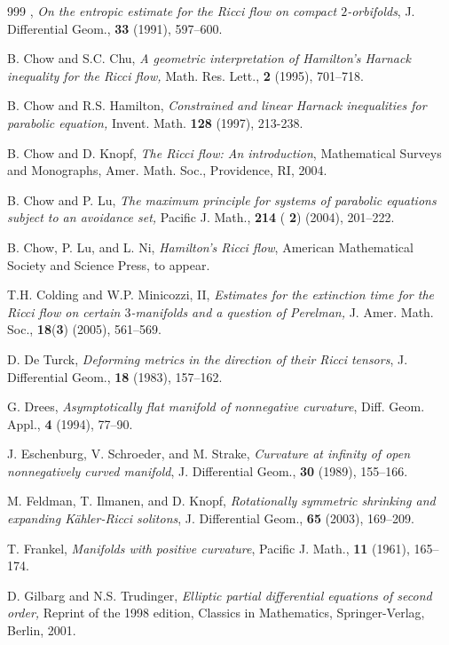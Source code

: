 \begin{thebibliography}{999}
 \bysame,
{\it On the entropic estimate for the Ricci flow on compact
$2$-orbifolds}, J. Differential Geom., {\bf 33} (1991), 597--600.

B. Chow and S.C. Chu,
{\it A geometric interpretation of Hamilton's Harnack inequality
for the Ricci flow,} Math. Res. Lett., \textbf{2} (1995),
701--718.

B. Chow and R.S. Hamilton,
{\it Constrained and linear Harnack inequalities for parabolic
equation,} Invent. Math. {\bf 128} (1997), 213-238.

B. Chow and D. Knopf,
{\it The Ricci flow: An introduction}, Mathematical Surveys and
Monographs, Amer. Math. Soc., Providence, RI, 2004.

B. Chow and P. Lu,
{\it The maximum principle for systems of parabolic equations
subject to an avoidance set,} Pacific J. Math., \textbf{214 }({\bf
2}) (2004), 201--222.

 B. Chow, P. Lu, and L. Ni,
{\it Hamilton's Ricci flow}, American Mathematical Society and
Science Press, to appear.

 T.H. Colding and W.P. Minicozzi, II,
{\it Estimates for the extinction time for the Ricci flow on
certain $3$-manifolds and a question of Perelman,} J. Amer. Math.
Soc., \textbf{18}({\bf 3}) (2005), 561--569.

D. De Turck,
{\it Deforming metrics in the direction of their Ricci tensors},
J. Differential Geom., {\bf 18} (1983), 157--162.

G. Drees,
{\it Asymptotically flat manifold of nonnegative curvature}, Diff.
Geom. Appl., \textbf{4} (1994), 77--90.

J. Eschenburg, V. Schroeder, and M. Strake,
{\it Curvature at infinity of open nonnegatively curved manifold},
J. Differential Geom., \textbf{30} (1989), 155--166.

M. Feldman, T. Ilmanen, and D. Knopf,
{\it Rotationally symmetric shrinking and expanding K\"ahler-Ricci
solitons}, J. Differential Geom., {\bf 65} (2003), 169--209.

 T. Frankel,
{\it Manifolds with positive curvature}, Pacific J. Math.,
\textbf{11} (1961), 165--174.

 D. Gilbarg and N.S. Trudinger,
{\it Elliptic partial differential equations of second order,}
Reprint of the 1998 edition, Classics in Mathematics,
Springer-Verlag, Berlin, 2001.


\end{thebibliography}
